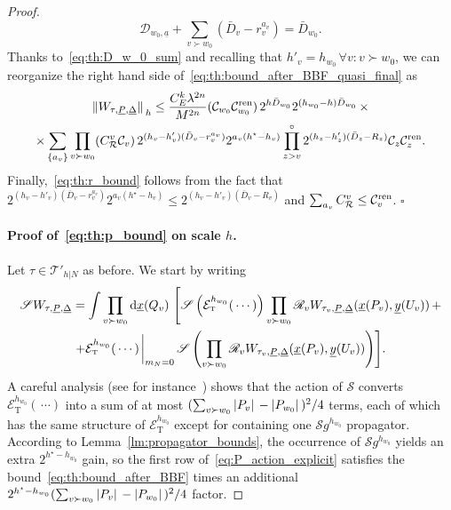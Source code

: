\documentclass[a4paper, 11pt]{article}
\newcommand{\sing}[2]{{#1}^{#2}}							%
\newcommand{\ren}{\mathcal{R}}								%
\newcommand{\kren}{\mathscr{R}}								%
\newcommand{\trees}{\mathcal{T}}							%
\newcommand{\TExp}[1]{\mathcal{E}^{#1}_%
{\scriptscriptstyle{\mathrm{T}}}}							%
\theoremstyle{thm}
\begin{document}
\begin{proof}
\begin{equation}
\label{eq:th:D_w_0_sum}
\mathscr{D}_{w_0, \underline{a}} + \sum_{v \succ w_0} (\bar{D}_v - r^{a_v}_v) = \bar{D}_{w_0}.
\end{equation}
Thanks to~\eqref{eq:th:D_w_0_sum} and recalling that $h'_v = h_{w_0} \, \forall v \colon v \succ w_0$, we can reorganize the right hand side of~\eqref{eq:th:bound_after_BBF_quasi_final} as
\begin{multline}
\label{eq:th:bound_quasi_final}
\norm*{W_{\tau, \underline{P}, \underline{\Delta}}}_h \le \frac{C_E^k \lambda^{2n}}{M^{2n}} (\mathcal{C}_{w_0} \mathcal{C}_{w_0}^{\textup{ren}}) \, 2^{h \bar{D}_{w_0}} 2^{(h_{w_0} - h) \bar{D}_{w_0}} \, \times \\
\times \sum_{\lbrace a_v \rbrace} \prod_{v \succ w_0} (C_\ren^v \mathcal{C}_v) \, 2^{(h_v - h'_v)(\bar{D}_v - r_v^{a_v})} 2^{a_v(h^\star - h_v)} \prod_{z > v}^\circ 2^{(h_z - h'_z)(\bar{D}_z - R_z)} \mathcal{C}_z \mathcal{C}^{\textup{ren}}_z.
\end{multline}
Finally,~\eqref{eq:th:r_bound} follows from the fact that $2^{(h_v - h'_v)(\bar{D}_v - r_v^{a_v})} 2^{a_v(h^\star - h_v)} \le 2^{(h_v - h'_v)(\bar{D}_v - R_v)}$ and $\sum_{a_v} C^v_\ren \le \mathcal{C}^{\textup{ren}}_v$. $\square$

\paragraph{Proof of~\eqref{eq:th:p_bound} on scale $h$.} Let $\tau \in \trees'_{h|N}$ as before. We start by writing
\begin{multline}
\label{eq:P_action_explicit}
\mathscr{S} W_{\tau, \underline{P}, \underline{\Delta}} = \int \prod_{v \succ w_0} \dd{\underline{x}(Q_v)} \, \Biggl[\mathscr{S} \left( \TExp{h_{w_0}}(\, \cdots) \right) \prod_{v \succ w_0} \kren_v W_{\tau_v, \underline{P}, \underline{\Delta}}(\underline{x}(P_v), \underline{y}(U_v)) \, + \\
+ \TExp{h_{w_0}}(\, \cdots) \eval_{m_N = 0} \, \mathscr{S} \left( \prod_{v \succ w_0} \kren_v W_{\tau_v, \underline{P}, \underline{\Delta}}(\underline{x}(P_v), \underline{y}(U_v)) \right) \Biggr].
\end{multline}
A careful analysis (see for instance~\cite[Appendix A4.3]{Giuliani_2005}) shows that the action of $\mathscr{S}$ converts $\TExp{h_{w_0}}(\, \cdots)$ into a sum of at most $(\sum_{v \succ w_0} \abs*{P_v} - \abs*{P_{w_0}})^2/4$ terms, each of which has the same structure of $\TExp{h_{w_0}}$ except for containing one $\mathscr{S} \sing{g}{h_{w_0}}$ propagator. According to Lemma~\ref{lm:propagator_bounds}, the occurrence of $\mathscr{S} \sing{g}{h_{w_0}}$ yields an extra $2^{h^\star - h_{w_0}}$ gain, so the first row of~\eqref{eq:P_action_explicit} satisfies the bound~\eqref{eq:th:bound_after_BBF} times an additional $2^{h^\star - h_{w_0}} (\sum_{v \succ w_0} \abs*{P_v} - \abs*{P_{w_0}})^2/4$ factor.


\end{proof}
\end{document}
